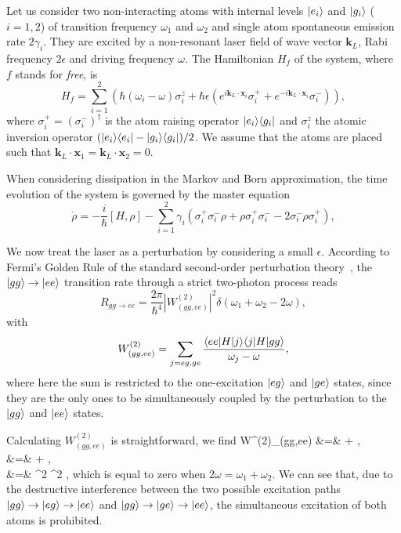 Let us consider two non-interacting atoms with internal levels $| e_i \rangle$ and $| g_i \rangle$ ($i=1,2$) of transition frequency $\omega_1$ and $\omega_2$ and single atom spontaneous emission rate $2 \gamma_i$. They are excited by a non-resonant laser field of wave vector $\mathbf k_L$, Rabi frequency $2\epsilon$ and driving frequency $\omega$. The Hamiltonian $H_f$  of the system, where $f$ stands for \emph{free}, is
\[ H_f = \sum_{i=1}^2 \left( \hbar (\omega_i-\omega) \sigma^{z}_i +   \hbar \epsilon \left(e^{i \mathbf k_L \cdot \mathbf x_i} \sigma^+_i +e^{-i \mathbf k_L \cdot \mathbf x_i} \sigma^-_i    \right) \right), \]
where $\sigma_i^+ = (\sigma_i^-)^{\dagger}$ is the atom raising operator $| e_i \rangle \langle g_i |$ and $\sigma_i^z$ the atomic inversion operator $(| e_i \rangle \langle e_i |-| g_i \rangle \langle g_i |)/2$. We assume that the atoms are placed such that $\mathbf k_L \cdot \mathbf x_1 = \mathbf k_L \cdot \mathbf x_2 = 0$.

When considering dissipation in the Markov and Born approximation, the time evolution of the system is governed by the master equation
\begin{equation}
    \dot\rho = - \frac{i}{\hbar} [H,\rho] -  \sum_{i=1}^2 \gamma_i (\sigma_i^+ \sigma_i^- \rho +\rho \sigma_i^+ \sigma_i^- -2 \sigma_i^- \rho \sigma_i^+), \label{eq-MEFS}
\end{equation}

We now treat the laser as a perturbation by considering a small $\epsilon$.
According to Fermi's Golden Rule of the standard second-order perturbation theory~\cite{Lou00}, the $| gg \rangle \rightarrow | ee \rangle$ transition rate through a strict two-photon process reads
\[ R_{gg \rightarrow ee} = \frac{2 \pi}{\hbar^4}  |W^{(2)}_{(gg,ee)}|^2 \delta(\omega_1+\omega_2 - 2\omega), \]
with
\[ W^{(2)}_{(gg,ee)} = \sum_{j=eg,ge} \frac{ \langle ee | H | j \rangle\langle j | H | gg \rangle }{\omega_j-\omega}, \]
where here the sum is restricted to the one-excitation $| eg \rangle$ and $| ge \rangle$ states, since they are the only ones to be simultaneously coupled by the perturbation to the $| gg \rangle$ and $| ee \rangle$ states.

Calculating $W^{(2)}_{(gg,ee)}$ is straightforward, we find
\bea
W^{(2)}_{(gg,ee)} &=& + , \\
&=&  + , \\
&=& \hbar^2 \epsilon^2  ,
\eea
which is equal to zero  when $2 \omega = \omega_1 + \omega_2$. We can see that, due to the destructive interference between the two possible excitation paths $| gg \rangle \rightarrow | eg \rangle \rightarrow  | ee \rangle$ and $| gg \rangle \rightarrow | ge \rangle \rightarrow  | ee \rangle$, the simultaneous excitation of both atoms is prohibited.

